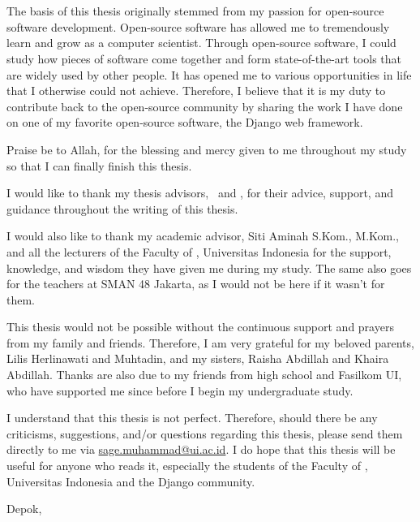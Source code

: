 \chapter*{\kataPengantar}

The basis of this thesis originally stemmed from my passion for open-source
software development. Open-source software has allowed me to tremendously
learn and grow as a computer scientist. Through open-source software, I could
study how pieces of software come together and form state-of-the-art tools that
are widely used by other people. It has opened me to various opportunities in
life that I otherwise could not achieve. Therefore, I believe that it is my
duty to contribute back to the open-source community by sharing the work I have
done on one of my favorite open-source software, the Django web framework.

Praise be to Allah, for the blessing and mercy given to me throughout my study
so that I can finally finish this thesis.

I would like to thank my thesis advisors, \pembimbingSatu\ and \pembimbingDua,
for their advice, support, and guidance throughout the writing of this thesis.

I would also like to thank my academic advisor, Siti Aminah S.Kom., M.Kom.,
and all the lecturers of the Faculty of \fakultas, Universitas Indonesia for
the support, knowledge, and wisdom they have given me during my study. The same
also goes for the teachers at SMAN 48 Jakarta, as I would not be here if it
wasn't for them.

This thesis would not be possible without the continuous support and prayers
from my family and friends. Therefore, I am very grateful for my beloved
parents, Lilis Herlinawati and Muhtadin, and my sisters, Raisha Abdillah and
Khaira Abdillah. Thanks are also due to my friends from high school and
Fasilkom UI, who have supported me since before I begin my undergraduate study.

I understand that this thesis is not perfect. Therefore, should there be any
criticisms, suggestions, and/or questions regarding this thesis, please send
them directly to me via
\href{mailto:sage.muhammad@ui.ac.id}{sage.muhammad@ui.ac.id}. I do hope that
this thesis will be useful for anyone who reads it, especially the students of
the Faculty of \fakultas, Universitas Indonesia and the Django community.

\vspace*{0.1cm}
\begin{flushright}
Depok, \tanggalSiapSidang\\[0.1cm]
\vspace*{1cm}
\penulis

\end{flushright}
